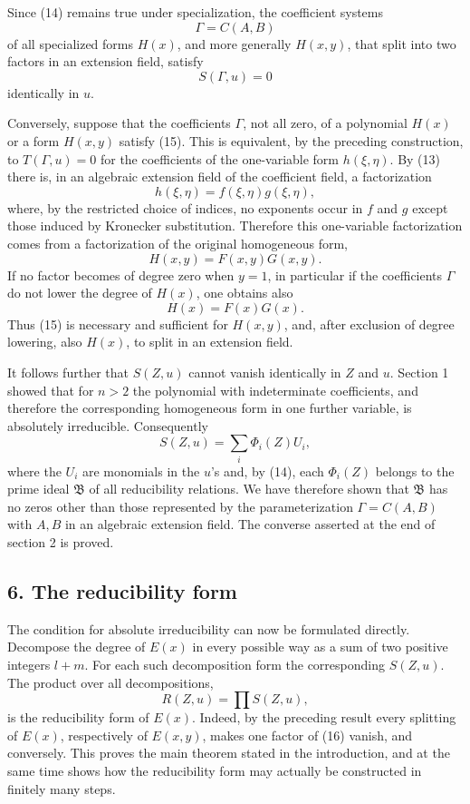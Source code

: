 \documentclass[11pt]{article}
\begin{document}
Since (14) remains true under specialization, the coefficient systems
\[
  \Gamma=C(A,B)
\]
of all specialized forms $H(x)$, and more generally $H(x,y)$, that split into two factors in an extension field, satisfy
\begin{equation}
  S(\Gamma,u)=0                                                   \tag{15}
\end{equation}
identically in $u$.

Conversely, suppose that the coefficients $\Gamma$, not all zero, of a polynomial $H(x)$ or a form $H(x,y)$ satisfy (15). This is equivalent, by the preceding construction, to $T(\Gamma,u)=0$ for the coefficients of the one-variable form $h(\xi,\eta)$. By (13) there is, in an algebraic extension field of the coefficient field, a factorization
\[
  h(\xi,\eta)=f(\xi,\eta)g(\xi,\eta),
\]
where, by the restricted choice of indices, no exponents occur in $f$ and $g$ except those induced by Kronecker substitution. Therefore this one-variable factorization comes from a factorization of the original homogeneous form,
\[
  H(x,y)=F(x,y)G(x,y).
\]
If no factor becomes of degree zero when $y=1$, in particular if the coefficients $\Gamma$ do not lower the degree of $H(x)$, one obtains also
\[
  H(x)=F(x)G(x).
\]
Thus (15) is necessary and sufficient for $H(x,y)$, and, after exclusion of degree lowering, also $H(x)$, to split in an extension field.

It follows further that $S(Z,u)$ cannot vanish identically in $Z$ and $u$. Section 1 showed that for $n>2$ the polynomial with indeterminate coefficients, and therefore the corresponding homogeneous form in one further variable, is absolutely irreducible. Consequently
\[
  S(Z,u)=\sum_i \Phi_i(Z)U_i,
\]
where the $U_i$ are monomials in the $u$'s and, by (14), each $\Phi_i(Z)$ belongs to the prime ideal $\mathfrak B$ of all reducibility relations. We have therefore shown that $\mathfrak B$ has no zeros other than those represented by the parameterization $\Gamma=C(A,B)$ with $A,B$ in an algebraic extension field. The converse asserted at the end of section 2 is proved.

\subsection*{6. The reducibility form}

The condition for absolute irreducibility can now be formulated directly. Decompose the degree of $E(x)$ in every possible way as a sum of two positive integers $l+m$. For each such decomposition form the corresponding $S(Z,u)$. The product over all decompositions,
\begin{equation}
  R(Z,u)=\prod S(Z,u),                                            \tag{16}
\end{equation}
is the reducibility form of $E(x)$. Indeed, by the preceding result every splitting of $E(x)$, respectively of $E(x,y)$, makes one factor of (16) vanish, and conversely. This proves the main theorem stated in the introduction, and at the same time shows how the reducibility form may actually be constructed in finitely many steps.
\end{document}
